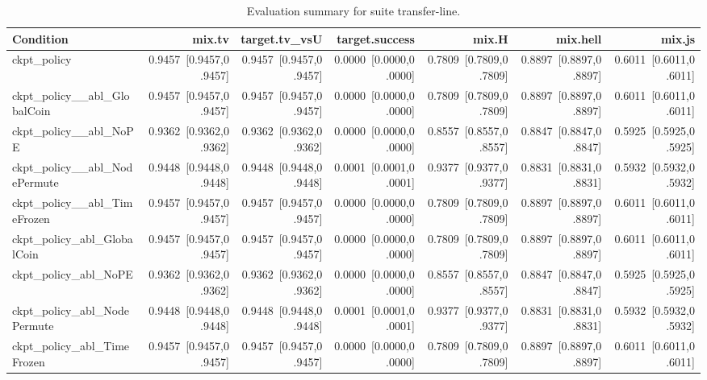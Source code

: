 \begin{table}[t]
\centering
\caption{Evaluation summary for suite transfer-line.}
\label{tab:eval_transfer-line}
\begin{tabular}{lrrrrrr}
\toprule
Condition & mix.tv & target.tv\_vsU & target.success & mix.H & mix.hell & mix.js \\
\midrule
ckpt\_policy & 0.9457~[0.9457,0.9457] & 0.9457~[0.9457,0.9457] & 0.0000~[0.0000,0.0000] & 0.7809~[0.7809,0.7809] & 0.8897~[0.8897,0.8897] & 0.6011~[0.6011,0.6011] \\
ckpt\_policy\_\_abl\_GlobalCoin & 0.9457~[0.9457,0.9457] & 0.9457~[0.9457,0.9457] & 0.0000~[0.0000,0.0000] & 0.7809~[0.7809,0.7809] & 0.8897~[0.8897,0.8897] & 0.6011~[0.6011,0.6011] \\
ckpt\_policy\_\_abl\_NoPE & 0.9362~[0.9362,0.9362] & 0.9362~[0.9362,0.9362] & 0.0000~[0.0000,0.0000] & 0.8557~[0.8557,0.8557] & 0.8847~[0.8847,0.8847] & 0.5925~[0.5925,0.5925] \\
ckpt\_policy\_\_abl\_NodePermute & 0.9448~[0.9448,0.9448] & 0.9448~[0.9448,0.9448] & 0.0001~[0.0001,0.0001] & 0.9377~[0.9377,0.9377] & 0.8831~[0.8831,0.8831] & 0.5932~[0.5932,0.5932] \\
ckpt\_policy\_\_abl\_TimeFrozen & 0.9457~[0.9457,0.9457] & 0.9457~[0.9457,0.9457] & 0.0000~[0.0000,0.0000] & 0.7809~[0.7809,0.7809] & 0.8897~[0.8897,0.8897] & 0.6011~[0.6011,0.6011] \\
ckpt\_policy\_abl\_GlobalCoin & 0.9457~[0.9457,0.9457] & 0.9457~[0.9457,0.9457] & 0.0000~[0.0000,0.0000] & 0.7809~[0.7809,0.7809] & 0.8897~[0.8897,0.8897] & 0.6011~[0.6011,0.6011] \\
ckpt\_policy\_abl\_NoPE & 0.9362~[0.9362,0.9362] & 0.9362~[0.9362,0.9362] & 0.0000~[0.0000,0.0000] & 0.8557~[0.8557,0.8557] & 0.8847~[0.8847,0.8847] & 0.5925~[0.5925,0.5925] \\
ckpt\_policy\_abl\_NodePermute & 0.9448~[0.9448,0.9448] & 0.9448~[0.9448,0.9448] & 0.0001~[0.0001,0.0001] & 0.9377~[0.9377,0.9377] & 0.8831~[0.8831,0.8831] & 0.5932~[0.5932,0.5932] \\
ckpt\_policy\_abl\_TimeFrozen & 0.9457~[0.9457,0.9457] & 0.9457~[0.9457,0.9457] & 0.0000~[0.0000,0.0000] & 0.7809~[0.7809,0.7809] & 0.8897~[0.8897,0.8897] & 0.6011~[0.6011,0.6011] \\
\bottomrule
\end{tabular}
\end{table}
